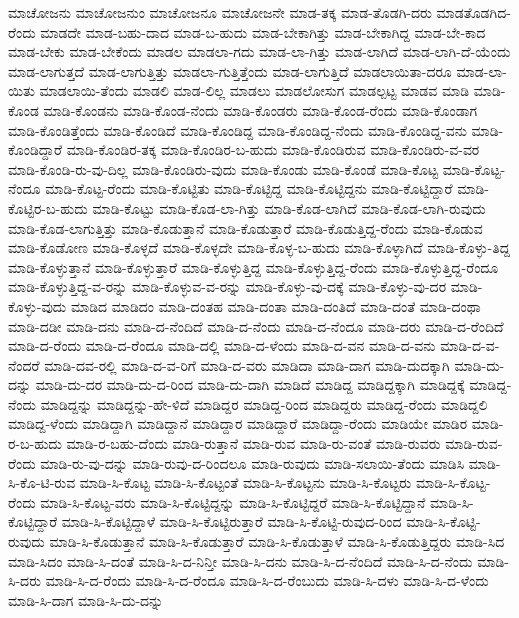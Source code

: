 ಮಾಚೋಜನು
ಮಾಚೋಜನುಂ
ಮಾಚೋಜನೂ
ಮಾಚೋಜನೇ
ಮಾಡ-ತಕ್ಕ
ಮಾಡ-ತೊಡಗಿ-ದರು
ಮಾಡತೊಡಗಿದ-ರೆಂದು
ಮಾಡದೇ
ಮಾಡ-ಬಹು-ದಾದ
ಮಾಡ-ಬ-ಹುದು
ಮಾಡ-ಬೇಕಾಗಿತ್ತು
ಮಾಡ-ಬೇಕಾಗಿದ್ದ
ಮಾಡ-ಬೇ-ಕಾದ
ಮಾಡ-ಬೇಕು
ಮಾಡ-ಬೇಕೆಂದು
ಮಾಡಲ
ಮಾಡಲಾ-ಗದು
ಮಾಡ-ಲಾ-ಗಿತ್ತು
ಮಾಡ-ಲಾಗಿದೆ
ಮಾಡ-ಲಾಗಿ-ದೆ-ಯೆಂದು
ಮಾಡ-ಲಾಗುತ್ತದೆ
ಮಾಡ-ಲಾಗುತ್ತಿತ್ತು
ಮಾಡಲಾ-ಗುತ್ತಿತ್ತೆಂದು
ಮಾಡ-ಲಾಗುತ್ತಿದೆ
ಮಾಡಲಾಯಿತಾ-ದರೂ
ಮಾಡ-ಲಾ-ಯಿತು
ಮಾಡಲಾಯಿ-ತೆಂದು
ಮಾಡಲಿ
ಮಾಡ-ಲಿಲ್ಲ
ಮಾಡಲು
ಮಾಡಲೋಸುಗ
ಮಾಡಲ್ಪಟ್ಟ
ಮಾಡವ
ಮಾಡಿ
ಮಾಡಿ-ಕೊಂಡ
ಮಾಡಿ-ಕೊಂಡನು
ಮಾಡಿ-ಕೊಂಡ-ನೆಂದು
ಮಾಡಿ-ಕೊಂಡರು
ಮಾಡಿ-ಕೊಂಡ-ರೆಂದು
ಮಾಡಿ-ಕೊಂಡಾಗ
ಮಾಡಿ-ಕೊಂಡಿತ್ತೆಂದು
ಮಾಡಿ-ಕೊಂಡಿದೆ
ಮಾಡಿ-ಕೊಂಡಿದ್ದ
ಮಾಡಿ-ಕೊಂಡಿದ್ದ-ನೆಂದು
ಮಾಡಿ-ಕೊಂಡಿದ್ದ-ವನು
ಮಾಡಿ-ಕೊಂಡಿದ್ದಾರೆ
ಮಾಡಿ-ಕೊಂಡಿರ-ತಕ್ಕ
ಮಾಡಿ-ಕೊಂಡಿರ-ಬ-ಹುದು
ಮಾಡಿ-ಕೊಂಡಿರುವ
ಮಾಡಿ-ಕೊಂಡಿರು-ವ-ವರ
ಮಾಡಿ-ಕೊಂಡಿ-ರು-ವು-ದಿಲ್ಲ
ಮಾಡಿ-ಕೊಂಡಿರು-ವುದು
ಮಾಡಿ-ಕೊಂಡು
ಮಾಡಿ-ಕೊಂಡೆ
ಮಾಡಿ-ಕೊಟ್ಟ
ಮಾಡಿ-ಕೊಟ್ಟ-ನೆಂದೂ
ಮಾಡಿ-ಕೊಟ್ಟ-ರೆಂದು
ಮಾಡಿ-ಕೊಟ್ಟಿತು
ಮಾಡಿ-ಕೊಟ್ಟಿದ್ದ
ಮಾಡಿ-ಕೊಟ್ಟಿದ್ದನು
ಮಾಡಿ-ಕೊಟ್ಟಿದ್ದಾರೆ
ಮಾಡಿ-ಕೊಟ್ಟಿರ-ಬ-ಹುದು
ಮಾಡಿ-ಕೊಟ್ಟು
ಮಾಡಿ-ಕೊಡ-ಲಾ-ಗಿತ್ತು
ಮಾಡಿ-ಕೊಡ-ಲಾಗಿದೆ
ಮಾಡಿ-ಕೊಡ-ಲಾಗಿ-ರುವುದು
ಮಾಡಿ-ಕೊಡ-ಲಾಗುತ್ತಿತ್ತು
ಮಾಡಿ-ಕೊಡುತ್ತಾನೆ
ಮಾಡಿ-ಕೊಡುತ್ತಾರೆ
ಮಾಡಿ-ಕೊಡುತ್ತಿದ್ದ-ರೆಂದು
ಮಾಡಿ-ಕೊಡುವ
ಮಾಡಿ-ಕೊಡೋಣ
ಮಾಡಿ-ಕೊಳ್ಳದೆ
ಮಾಡಿ-ಕೊಳ್ಳದೇ
ಮಾಡಿ-ಕೊಳ್ಳ-ಬ-ಹುದು
ಮಾಡಿ-ಕೊಳ್ಳಾಗಿದೆ
ಮಾಡಿ-ಕೊಳ್ಳು-ತಿದ್ದ
ಮಾಡಿ-ಕೊಳ್ಳುತ್ತಾನೆ
ಮಾಡಿ-ಕೊಳ್ಳುತ್ತಾರೆ
ಮಾಡಿ-ಕೊಳ್ಳುತ್ತಿದ್ದ
ಮಾಡಿ-ಕೊಳ್ಳುತ್ತಿದ್ದ-ರೆಂದು
ಮಾಡಿ-ಕೊಳ್ಳುತ್ತಿದ್ದ-ರೆಂದೂ
ಮಾಡಿ-ಕೊಳ್ಳುತ್ತಿದ್ದ-ವ-ರನ್ನು
ಮಾಡಿ-ಕೊಳ್ಳುವ-ವ-ರನ್ನು
ಮಾಡಿ-ಕೊಳ್ಳು-ವು-ದಕ್ಕೆ
ಮಾಡಿ-ಕೊಳ್ಳು-ವು-ದರ
ಮಾಡಿ-ಕೊಳ್ಳು-ವುದು
ಮಾಡಿದ
ಮಾಡಿದಂ
ಮಾಡಿ-ದಂತಹ
ಮಾಡಿ-ದಂತಾ
ಮಾಡಿ-ದಂತಿದೆ
ಮಾಡಿ-ದಂತೆ
ಮಾಡಿ-ದಂಥಾ
ಮಾಡಿ-ದಡೀ
ಮಾಡಿ-ದನು
ಮಾಡಿ-ದ-ನೆಂದಿದೆ
ಮಾಡಿ-ದ-ನೆಂದು
ಮಾಡಿ-ದ-ನೆಂದೂ
ಮಾಡಿ-ದರು
ಮಾಡಿ-ದ-ರೆಂದಿದೆ
ಮಾಡಿ-ದ-ರೆಂದು
ಮಾಡಿ-ದ-ರೆಂದೂ
ಮಾಡಿ-ದಲ್ಲಿ
ಮಾಡಿ-ದ-ಳೆಂದು
ಮಾಡಿ-ದ-ವನ
ಮಾಡಿ-ದ-ವನು
ಮಾಡಿ-ದ-ವ-ನೆಂದರೆ
ಮಾಡಿ-ದವ-ರಲ್ಲಿ
ಮಾಡಿ-ದ-ವ-ರಿಗೆ
ಮಾಡಿ-ದ-ವರು
ಮಾಡಿದಾ
ಮಾಡಿ-ದಾಗ
ಮಾಡಿ-ದುದಕ್ಕಾಗಿ
ಮಾಡಿ-ದು-ದನ್ನು
ಮಾಡಿ-ದು-ದರ
ಮಾಡಿ-ದು-ದ-ರಿಂದ
ಮಾಡಿ-ದು-ದಾಗಿ
ಮಾಡಿದೆ
ಮಾಡಿದ್ದ
ಮಾಡಿದ್ದಕ್ಕಾಗಿ
ಮಾಡಿದ್ದಕ್ಕೆ
ಮಾಡಿದ್ದ-ನೆಂದು
ಮಾಡಿದ್ದನ್ನು
ಮಾಡಿದ್ದನ್ನು-ಹೇ-ಳಿದೆ
ಮಾಡಿದ್ದರ
ಮಾಡಿದ್ದ-ರಿಂದ
ಮಾಡಿದ್ದರು
ಮಾಡಿದ್ದ-ರೆಂದು
ಮಾಡಿದ್ದಲಿ
ಮಾಡಿದ್ದ-ಳೆಂದು
ಮಾಡಿದ್ದಾಗಿ
ಮಾಡಿದ್ದಾನೆ
ಮಾಡಿದ್ದಾರ
ಮಾಡಿದ್ದಾರೆ
ಮಾಡಿದ್ದಾ-ರೆಂದು
ಮಾಡಿಯೇ
ಮಾಡಿರ
ಮಾಡಿ-ರ-ಬ-ಹುದು
ಮಾಡಿ-ರ-ಬಹು-ದೆಂದು
ಮಾಡಿ-ರುತ್ತಾನೆ
ಮಾಡಿ-ರುವ
ಮಾಡಿ-ರು-ವಂತೆ
ಮಾಡಿ-ರುವರು
ಮಾಡಿ-ರುವ-ರೆಂದು
ಮಾಡಿ-ರು-ವು-ದನ್ನು
ಮಾಡಿ-ರುವು-ದ-ರಿಂದಲೂ
ಮಾಡಿ-ರುವುದು
ಮಾಡಿ-ಸಲಾಯಿ-ತೆಂದು
ಮಾಡಿಸಿ
ಮಾಡಿ-ಸಿ-ಕೊ-ಟಿ-ರುವ
ಮಾಡಿ-ಸಿ-ಕೊಟ್ಟ
ಮಾಡಿ-ಸಿ-ಕೊಟ್ಟಂತೆ
ಮಾಡಿ-ಸಿ-ಕೊಟ್ಟನು
ಮಾಡಿ-ಸಿ-ಕೊಟ್ಟರು
ಮಾಡಿ-ಸಿ-ಕೊಟ್ಟ-ರೆಂದು
ಮಾಡಿ-ಸಿ-ಕೊಟ್ಟ-ವರು
ಮಾಡಿ-ಸಿ-ಕೊಟ್ಟಿದ್ದನ್ನು
ಮಾಡಿ-ಸಿ-ಕೊಟ್ಟಿದ್ದರೆ
ಮಾಡಿ-ಸಿ-ಕೊಟ್ಟಿದ್ದಾನೆ
ಮಾಡಿ-ಸಿ-ಕೊಟ್ಟಿದ್ದಾರೆ
ಮಾಡಿ-ಸಿ-ಕೊಟ್ಟಿದ್ದಾಳೆ
ಮಾಡಿ-ಸಿ-ಕೊಟ್ಟಿರುತ್ತಾರೆ
ಮಾಡಿ-ಸಿ-ಕೊಟ್ಟಿ-ರುವುದ-ರಿಂದ
ಮಾಡಿ-ಸಿ-ಕೊಟ್ಟಿ-ರುವುದು
ಮಾಡಿ-ಸಿ-ಕೊಡುತ್ತಾನೆ
ಮಾಡಿ-ಸಿ-ಕೊಡುತ್ತಾರೆ
ಮಾಡಿ-ಸಿ-ಕೊಡುತ್ತಾಳೆ
ಮಾಡಿ-ಸಿ-ಕೊಡುತ್ತಿದ್ದರು
ಮಾಡಿ-ಸಿದ
ಮಾಡಿ-ಸಿದಂ
ಮಾಡಿ-ಸಿ-ದಂತೆ
ಮಾಡಿ-ಸಿ-ದ-ನಿನ್ತೀ
ಮಾಡಿ-ಸಿ-ದನು
ಮಾಡಿ-ಸಿ-ದ-ನೆಂದಿದೆ
ಮಾಡಿ-ಸಿ-ದ-ನೆಂದು
ಮಾಡಿ-ಸಿ-ದರು
ಮಾಡಿ-ಸಿ-ದ-ರೆಂದು
ಮಾಡಿ-ಸಿ-ದ-ರೆಂದೂ
ಮಾಡಿ-ಸಿ-ದ-ರೆಂಬುದು
ಮಾಡಿ-ಸಿ-ದಳು
ಮಾಡಿ-ಸಿ-ದ-ಳೆಂದು
ಮಾಡಿ-ಸಿ-ದಾಗ
ಮಾಡಿ-ಸಿ-ದು-ದನ್ನು
